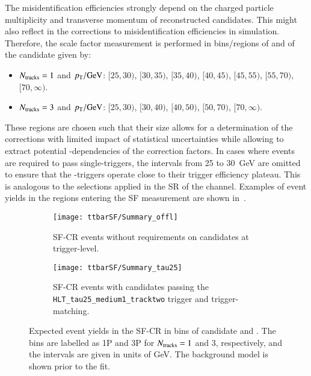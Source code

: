 The \jettotauhadvis misidentification efficiencies strongly depend on the
charged particle multiplicity and transverse momentum of reconstructed
\tauhadvis candidates. This might also reflect in the corrections to
\jettotauhadvis misidentification efficiencies in simulation. Therefore, the
scale factor measurement is performed in bins/regions of \Ntracks and \pT of the
\tauhadvis candidate given by:
\begin{itemize}

\item $\Ntracks = 1$ and $\pT / \si{\GeV}$: $[25, 30)$, $[30, 35)$, $[35, 40)$,
  $[40, 45)$, $[45, 55)$, $[55, 70)$, $[70, \infty)$.

\item $\Ntracks = 3$ and $\pT / \si{\GeV}$: $[25, 30)$, $[30, 40)$, $[40, 50)$,
  $[50, 70)$, $[70, \infty)$.

\end{itemize}
These regions are chosen such that their size allows for a determination of the
corrections with limited impact of statistical uncertainties while allowing to
extract potential \pT-dependencies of the correction factors. In cases where
events are required to pass single-\tauhadvis triggers, the \pT intervals from
25 to \SI{30}{\GeV} are omitted to ensure that the \tauhadvis-triggers operate
close to their trigger efficiency plateau. This is analogous to the selections
applied in the SR of the \hadhad channel. Examples of event yields in the
regions entering the SF measurement are shown
in~.

\begin{figure}[htbp]
  \centering

  \begin{subfigure}[t]{.485\textwidth}
    \texttt{[image: ttbarSF/Summary\_offl]}
    \caption{SF-CR events without requirements on \tauhadvis candidates at
      trigger-level.}
  \end{subfigure}\hfill%
  \begin{subfigure}[t]{.485\textwidth}
    \texttt{[image: ttbarSF/Summary\_tau25]}
    \caption{SF-CR events with \tauhadvis candidates passing the
      \texttt{HLT\_tau25\_medium1\_tracktwo} trigger and trigger-matching.}
  \end{subfigure}

  \caption{Expected event yields in the SF-CR in bins of \tauhadvis candidate
    \Ntracks and \pT. The bins are labelled as 1P and 3P for $\Ntracks = 1$ and
    $3$, respectively, and the \pT intervals are given in units of
    \si{\GeV}. The background model is shown prior to the fit.}%
  \label{fig:ttbarsf_region_summary_prefit}
\end{figure}


